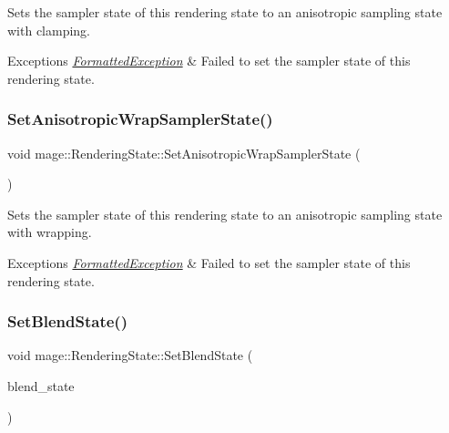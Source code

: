 Sets the sampler state of this rendering state to an anisotropic sampling state with clamping.


\begin{DoxyExceptions}{Exceptions}
{\em \hyperlink{structmage_1_1_formatted_exception}{Formatted\+Exception}} & Failed to set the sampler state of this rendering state. \\
\hline
\end{DoxyExceptions}
\hypertarget{structmage_1_1_rendering_state_a92318b9b250555ca1d6b516d49371abc}{}\label{structmage_1_1_rendering_state_a92318b9b250555ca1d6b516d49371abc} 
\subsubsection{\texorpdfstring{Set\+Anisotropic\+Wrap\+Sampler\+State()}{SetAnisotropicWrapSamplerState()}}
{\footnotesize\ttfamily void mage\+::\+Rendering\+State\+::\+Set\+Anisotropic\+Wrap\+Sampler\+State (\begin{DoxyParamCaption}{ }\end{DoxyParamCaption})}

Sets the sampler state of this rendering state to an anisotropic sampling state with wrapping.


\begin{DoxyExceptions}{Exceptions}
{\em \hyperlink{structmage_1_1_formatted_exception}{Formatted\+Exception}} & Failed to set the sampler state of this rendering state. \\
\hline
\end{DoxyExceptions}
\hypertarget{structmage_1_1_rendering_state_aa91119e7704856c097adb20b6080a26e}{}\label{structmage_1_1_rendering_state_aa91119e7704856c097adb20b6080a26e} 
\subsubsection{\texorpdfstring{Set\+Blend\+State()}{SetBlendState()}}
{\footnotesize\ttfamily void mage\+::\+Rendering\+State\+::\+Set\+Blend\+State (\begin{DoxyParamCaption}\item[{I\+D3\+D11\+Blend\+State $\ast$}]{blend\+\_\+state }\end{DoxyParamCaption})\hspace{0.3cm}{\ttfamily [noexcept]}}

